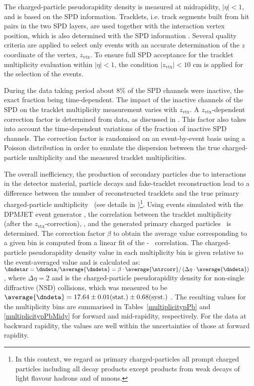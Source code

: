 
The charged-particle pseudorapidity density \dndeta is measured at midrapidity, $|\eta|<1$, and is based on the SPD information. Tracklets, i.e. track segments built from hit pairs in the two SPD layers, are used together with the interaction vertex position, which is also determined with the SPD information \cite{Abelev:2013ab}. Several quality criteria are applied to select only events with an accurate determination of the $z$ coordinate of the vertex, $z_{\mathrm{vtx}}$. To ensure full SPD acceptance for the tracklet multiplicity \ntr evaluation within $|\eta|<1$, the condition $|z_{\mathrm{vtx}}|< 10$ cm is applied for the selection of the events. 

During the data taking period about $8\%$ of the SPD channels were inactive, the exact fraction being time-dependent.
 The impact of the inactive channels of the SPD on the tracklet multiplicity measurement varies with $z_{\mathrm{vtx}}$. 
A $z_{\mathrm{vtx}}$-dependent correction factor is determined from data, as discussed in \cite{Abelev:2012aa}. This factor also takes into account the time-dependent variations of the fraction of inactive SPD channels.
The correction factor is randomised on an event-by-event basis using a Poisson distribution in order to emulate the dispersion between the true charged-particle multiplicity and the measured tracklet multiplicities.

The overall inefficiency, the production of secondary particles due to interactions in the detector material, particle decays and fake-tracklet reconstruction lead to a difference between the number of reconstructed tracklets and the true primary charged-particle multiplicity \nch ~(see details in \cite{Abelev:2013ab})\footnote{In this context, we regard as primary charged-particles all prompt charged particles including all decay products except products from weak decays of light flavour hadrons and of muons.}. 
Using  events simulated with the DPMJET event generator \cite{Roesler:2000he}, the correlation between the tracklet multiplicity (after the $z_{\mathrm{vtx}}$-correction), \ntrcorr, and the generated primary charged particles \nch ~is determined. 
The correction factor $\beta$ to obtain the average \dndeta value corresponding to a given \ntrcorr bin is computed from a linear fit of the \ntrcorr - \nch ~correlation. 
The charged-particle pseudorapidity density value in each multiplicity bin is given relative to the event-averaged value and is calculated as: 
$\dndetar = \dndeta / \average{\dndeta} = \beta \cdot \average{\ntrcorr} / \left(\Delta \eta \cdot \average{\dndeta}\right)$, where $\Delta\eta=2$ and \average{\dndeta} is the charged-particle pseudorapidity density for non-single diffractive (NSD) collisions, which was measured  to be $ \average{\dndeta} = 17.64 \pm 0.01 (\rm{stat.}) \pm 0.68 (\rm{syst.})$ %
\cite{Abelev:2013ab}. The resulting values for the multiplicity bins are summarised in Tables~\ref{multiplicitypPb} and \ref{multiplicitypPbMidy} for forward and mid-rapidity, respectively.  
For the data at backward rapidity, the values are well within the uncertainties of those at forward rapidity.

